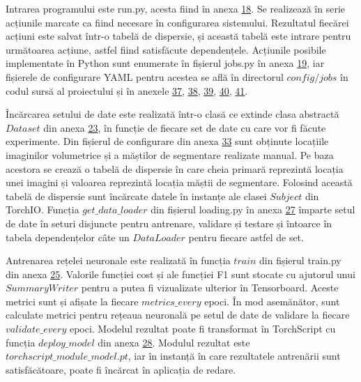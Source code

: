 Intrarea programului este run.py, acesta fiind în anexa \hyperref[appendix:18_run_py]{18}. Se realizează în serie acțiunile marcate ca fiind necesare în configurarea sistemului. Rezultatul fiecărei acțiuni este salvat într-o tabelă de dispersie, și această tabelă este intrare pentru următoarea acțiune, astfel fiind satisfăcute dependențele. Acțiunile posibile implementate în Python sunt enumerate în fișierul jobs.py în anexa \hyperref[appendix:19_jobs_py]{19}, iar fișierele de configurare YAML pentru acestea se află în directorul $config/jobs$ în codul sursă al proiectului și în anexele \hyperref[appendix:37_config_load_data_yaml]{37}, \hyperref[appendix:38_config_load_model_yaml]{38}, \hyperref[appendix:39_config_train_model_yaml]{39}, \hyperref[appendix:40_config_test_model_yaml]{40}, \hyperref[appendix:41_config_deploy_yaml]{41}.


Încărcarea setului de date este realizată într-o clasă ce extinde clasa abstractă $Dataset$ din anexa \hyperref[appendix:23_data_generic_py]{23}, în funcție de fiecare set de date cu care vor fi făcute experimente. Din fișierul de configurare din anexa \hyperref[appendix:33_config_ct_org_yaml]{33} sunt obținute locațiile imaginilor volumetrice și a măștilor de segmentare realizate manual. Pe baza acestora se crează o tabelă de dispersie în care cheia primară reprezintă locația unei imagini și valoarea reprezintă locația măștii de segmentare. Folosind această tabelă de dispersie sunt încărcate datele în instanțe ale clasei $Subject$ din TorchIO. Funcția $get\_data\_loader$ din fișierul loading.py în anexa \hyperref[appendix:27_model_loading_py]{27} împarte setul de date în seturi disjuncte pentru antrenare, validare și testare și întoarce în tabela dependențelor câte un $DataLoader$ pentru fiecare astfel de set.

Antrenarea rețelei neuronale este realizată în funcția $train$ din fișierul train.py din anexa \hyperref[appendix:25_model_train_py]{25}. Valorile funcției cost și ale funcției F1 sunt stocate cu ajutorul unui $SummaryWriter$ pentru a putea fi vizualizate ulterior în Tensorboard. Aceste metrici sunt și afișate la fiecare $metrics\_every$ epoci. În mod asemănător, sunt calculate metrici pentru rețeaua neuronală pe setul de date de validare la fiecare $validate\_every$ epoci. Modelul rezultat poate fi transformat în TorchScript cu funcția $deploy\_model$ din anexa \hyperref[appendix:28_model_deploy_py]{28}. Modulul rezultat este $torchscript\_module\_model.pt$, iar în instanță în care rezultatele antrenării sunt satisfăcătoare, poate fi încărcat în aplicația de redare.

